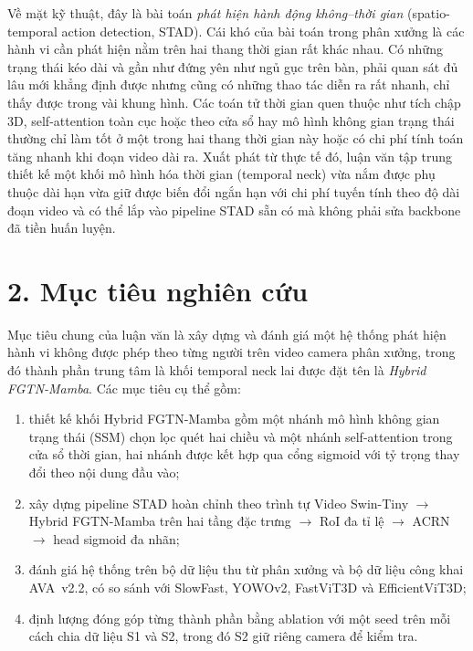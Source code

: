 Về mặt kỹ thuật, đây là bài toán \emph{phát hiện hành động không--thời gian} (spatio-temporal action detection, STAD). Cái khó của bài toán trong phân xưởng là các hành vi cần phát hiện nằm trên hai thang thời gian rất khác nhau. Có những trạng thái kéo dài và gần như đứng yên như ngủ gục trên bàn, phải quan sát đủ lâu mới khẳng định được nhưng cũng có những thao tác diễn ra rất nhanh, chỉ thấy được trong vài khung hình. Các toán tử thời gian quen thuộc như tích chập 3D, self-attention toàn cục hoặc theo cửa sổ hay mô hình không gian trạng thái thường chỉ làm tốt ở một trong hai thang thời gian này hoặc có chi phí tính toán tăng nhanh khi đoạn video dài ra. Xuất phát từ thực tế đó, luận văn tập trung thiết kế một khối mô hình hóa thời gian (temporal neck) vừa nắm được phụ thuộc dài hạn vừa giữ được biến đổi ngắn hạn với chi phí tuyến tính theo độ dài đoạn video và có thể lắp vào pipeline STAD sẵn có mà không phải sửa backbone đã tiền huấn luyện.

\section*{2. Mục tiêu nghiên cứu}

Mục tiêu chung của luận văn là xây dựng và đánh giá một hệ thống phát hiện hành vi không được phép theo từng người trên video camera phân xưởng, trong đó thành phần trung tâm là khối temporal neck lai được đặt tên là \emph{Hybrid FGTN-Mamba}. Các mục tiêu cụ thể gồm:
\begin{enumerate}[label=(\roman*)]
  \item thiết kế khối Hybrid FGTN-Mamba gồm một nhánh mô hình không gian trạng thái (SSM) chọn lọc quét hai chiều và một nhánh self-attention trong cửa sổ thời gian, hai nhánh được kết hợp qua cổng sigmoid với tỷ trọng thay đổi theo nội dung đầu vào;
  \item xây dựng pipeline STAD hoàn chỉnh theo trình tự Video Swin-Tiny $\rightarrow$ Hybrid FGTN-Mamba trên hai tầng đặc trưng $\rightarrow$ RoI đa tỉ lệ $\rightarrow$ ACRN $\rightarrow$ head sigmoid đa nhãn;
  \item đánh giá hệ thống trên bộ dữ liệu thu từ phân xưởng và bộ dữ liệu công khai AVA~v2.2, có so sánh với SlowFast, YOWOv2, FastViT3D và EfficientViT3D;
  \item định lượng đóng góp từng thành phần bằng ablation với một seed trên mỗi cách chia dữ liệu S1 và S2, trong đó S2 giữ riêng camera để kiểm tra.
\end{enumerate}

